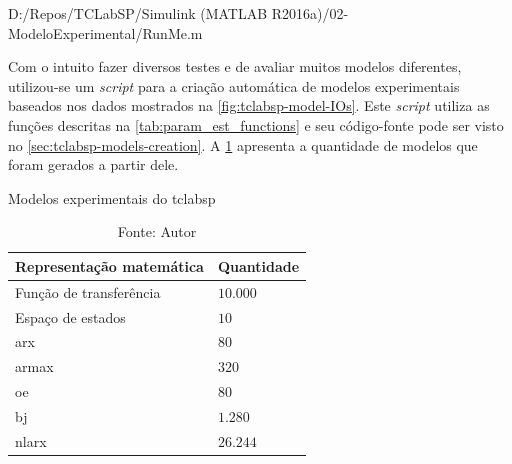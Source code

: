 
	{D:/Repos/TCLabSP/Simulink (MATLAB R2016a)/02-ModeloExperimental/RunMe.m}
	\begin{center}
    \end{center}

Com o intuito fazer diversos testes e de avaliar muitos modelos diferentes, utilizou-se um
\textit{script} para a criação automática de modelos experimentais baseados nos dados mostrados
na \cref{fig:tclabsp-model-IOs}. Este \textit{script} utiliza as funções descritas na \cref{tab:param_est_functions}
e seu código-fonte pode ser visto no \cref{sec:tclabsp-models-creation}. 
A \cref{tab:tclabsp-models-description} apresenta a quantidade de modelos que foram gerados a partir dele.

\begin{table}[h]
	\centering
	\caption{Modelos experimentais do \acrshort{tclabsp}}
	\label{tab:tclabsp-models-description}
	\begin{tabular}{ll} \toprule
		{Representação matemática}		                                & {Quantidade}          \\ \midrule
		Função de transferência		                                    & $10.000$              \\
		Espaço de estados   		                                    & $10$                  \\
		\acrshort{arx}		                                            & $80$                  \\
		\acrshort{armax}		                                        & $320$                 \\
		\acrshort{oe}													& $80$                  \\
		\acrshort{bj}                                   				& $1.280$               \\
		\acrshort{nlarx}                    							& $26.244$              \\ \bottomrule
	\end{tabular}
	\caption*{Fonte: Autor}
\end{table}

